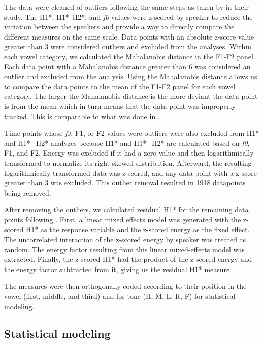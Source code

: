 The data were cleaned of outliers following the same steps as taken by \citet{chaiH1H2Acoustic2022} in their study. The H1*, H1*–H2*, and \textit{f0} values were z-scored by speaker to reduce the variation between the speakers and provide a way to directly compare the different measures on the same scale. Data points with an absolute z-score value greater than 3 were considered outliers and excluded from the analyses. Within each vowel category, we calculated the Mahalanobis distance in the F1-F2 panel. Each data point with a Mahalanobis distance greater than 6 was considered an outlier and excluded from the analysis. Using the Mahalanobis distance allows us to compare the data points to the mean of the F1-F2 panel for each vowel category. The larger the Mahalanobis distance is the more deviant the data point is from the mean which in turn means that the data point was improperly tracked. This is comparable to what was done in \citet{seyfarthPlosiveVoicingAcoustics2018,chaiCheckedSyllablesChecked2022,garellekPhoneticsWhiteHmong2023}.

Time points whose \textit{f}0, F1, or F2 values were outliers were also excluded from H1* and H1*$-$H2* analyzes because H1* and H1*$-$H2* are calculated based on \textit{f0}, F1, and F2. Energy was excluded if it had a zero value and then logarithmically transformed to normalize its right-skewed distribution. Afterward, the resulting logarithmically transformed data was z-scored, and any data point with a z-score greater than 3 was excluded. This outlier removal resulted in 1918 datapoints being removed. 

After removing the outliers, we calculated residual H1* for the remaining data points following \citet{chaiH1H2Acoustic2022}. First, a linear mixed effects model was generated with the z-scored H1* as the response variable and the z-scored energy as the fixed effect. The uncorrelated interaction of the z-scored energy by speaker was treated as random. The energy factor resulting from this linear mixed-effects model was extracted. Finally, the z-scored H1* had the product of the z-scored energy and the energy factor subtracted from it, giving us the residual H1* measure.

The measures were then orthogonally coded according to their position in the vowel (first, middle, and third) and for tone (H, M, L, R, F) for statistical modeling.  

\subsection{Statistical modeling} \label{sec:StatisticalModeling}

